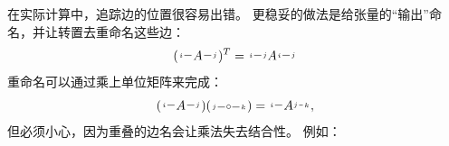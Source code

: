 在实际计算中，追踪边的位置很容易出错。
更稳妥的做法是给张量的“输出”命名，并让转置去重命名这些边：
\[
   (\begin{tikzpicture}[baseline=(A.base), inner sep=1pt]
   \node (A) {$A$};
   \draw (A.west) -- ++(-.2,0) node[left, font=\tiny] {$i$};
   \draw (A.east) -- ++(.2,0) node[right, font=\tiny] {$j$};
\end{tikzpicture})^T
=
\begin{tikzpicture}[baseline=(A.base), inner sep=1pt]
   \node (A) {$A$};
   \node[font=\tiny] (i) at (-.2,0) {$j$};
   \node[font=\tiny] (j) at (.2,0) {$i$};
   \draw (i.west) -- ++(-.2,0) node[left, font=\tiny] {$i$};
   \draw (j.east) -- ++(.2,0) node[right, font=\tiny] {$j$};
\end{tikzpicture}
\]
%
重命名可以通过乘上单位矩阵来完成：
\[
(\begin{tikzpicture}[baseline=(A.base), inner sep=1pt]
   \node (A) {$A$};
   \draw (A.west) -- ++(-.2,0) node[left, font=\tiny] {$i$};
   \draw (A.east) -- ++(.2,0) node[right, font=\tiny] {$j$};
\end{tikzpicture})
(
\begin{tikzpicture}[baseline=(A.base), inner sep=1pt]
   \node (A) {$\sbullet$};
   \draw (A.west) -- ++(-.2,0) node[left, font=\tiny] {$j$};
   \draw (A.east) -- ++(.2,0) node[right, font=\tiny] {$k$};
\end{tikzpicture})
=
\begin{tikzpicture}[baseline=(A.base), inner sep=1pt]
   \node (A) {$A$};
   \draw (A.west) -- ++(-.2,0) node[left, font=\tiny] {$i$};
   \node[font=\tiny] (j) at (.2,0) {$j$};
   \draw (j) -- ++(.2,0) node[right, font=\tiny] {$k$};
\end{tikzpicture},
\]
但必须小心，因为重叠的边名会让乘法失去结合性。
例如：
